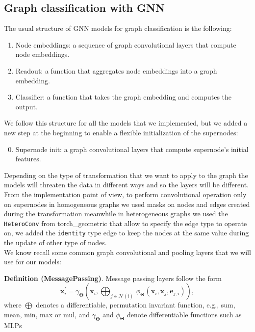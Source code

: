 \documentclass[twoside,11pt]{article}
\begin{document}
\subsection{Graph classification with GNN} %
\label{sub:graph_classification_with_gnn}
The usual structure of GNN models for graph classification is the following:
\begin{enumerate}
    \item Node embeddings: a sequence of graph convolutional layers that compute node embeddings.
    \item Readout: a function that aggregates node embeddings into a graph embedding.
    \item Classifier: a function that takes the graph embedding and computes the output.
\end{enumerate}
    \noindent
    We follow this structure for all the models that we implemented, but we added a new step at the beginning to enable a flexible initialization of the supernodes:
    \begin{enumerate}
        \setcounter{enumi}{-1}
        \item Supernode init: a graph convolutional layers that compute supernode's initial features.
    \end{enumerate}
\noindent
Depending on the type of transformation that we want to apply to the graph the models will threaten the data in different ways and so the layers will be different.\\
From the implementation point of view, to perform convolutional operation only on supernodes in homogeneous graphs we used masks on nodes and edges created during the transformation meanwhile in heterogeneous graphs we used the \texttt{HeteroConv} from torch\_geometric that allow to specify the edge type to operate on, we added the \texttt{identity} type edge to keep the nodes at the same value during the update of other type of nodes.\\


\noindent
We know recall some common graph convolutional and pooling layers that we will use for our models:

\noindent
{\bf Definition (MessagePassing)}.
{
        Message passing layers follow the form
        \[
            \mathbf{x}_i^{\prime} = \gamma_{\mathbf{\Theta}} \left( \mathbf{x}_i, \bigoplus_{j \in \mathcal{N}(i)} \, \phi_{\mathbf{\Theta}} \left(\mathbf{x}_i, \mathbf{x}_j,\mathbf{e}_{j,i}\right) \right),
        \]
        where \( \bigoplus \) denotes a differentiable, permutation invariant function, e.g., sum, mean, min, max or mul, and \( \gamma_{\mathbf{\Theta}} \) and \( \phi_{\mathbf{\Theta}} \) denote differentiable functions such as MLPs
}\\
\end{document}
